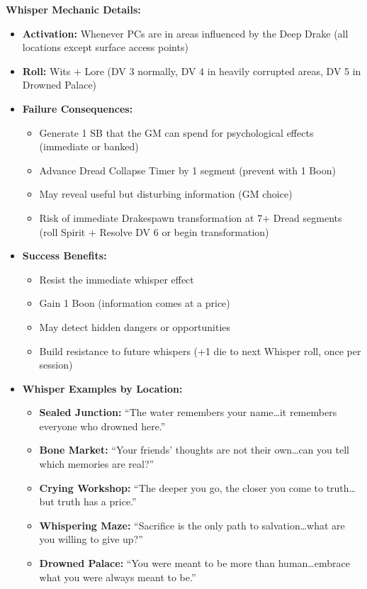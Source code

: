 \documentclass[11pt]{article}
\begin{document}
\textbf{Whisper Mechanic Details:}
\begin{itemize}
\item \textbf{Activation:} Whenever PCs are in areas influenced by the Deep Drake (all locations except surface access points)
\item \textbf{Roll:} Wits + Lore (DV 3 normally, DV 4 in heavily corrupted areas, DV 5 in Drowned Palace)
\item \textbf{Failure Consequences:}
  \begin{itemize}
  \item Generate 1 SB that the GM can spend for psychological effects (immediate or banked)
  \item Advance Dread Collapse Timer by 1 segment (prevent with 1 Boon)
  \item May reveal useful but disturbing information (GM choice)
  \item Risk of immediate Drakespawn transformation at 7+ Dread segments (roll Spirit + Resolve DV 6 or begin transformation)
  \end{itemize}
\item \textbf{Success Benefits:}
  \begin{itemize}
  \item Resist the immediate whisper effect
  \item Gain 1 Boon (information comes at a price)
  \item May detect hidden dangers or opportunities
  \item Build resistance to future whispers (+1 die to next Whisper roll, once per session)
  \end{itemize}
\item \textbf{Whisper Examples by Location:}
  \begin{itemize}
  \item \textbf{Sealed Junction:} ``The water remembers your name\dots it remembers everyone who drowned here.''
  \item \textbf{Bone Market:} ``Your friends' thoughts are not their own\dots can you tell which memories are real?''
  \item \textbf{Crying Workshop:} ``The deeper you go, the closer you come to truth\dots but truth has a price.''
  \item \textbf{Whispering Maze:} ``Sacrifice is the only path to salvation\dots what are you willing to give up?''
  \item \textbf{Drowned Palace:} ``You were meant to be more than human\dots embrace what you were always meant to be.''
  \end{itemize}
\end{itemize}
\end{document}

